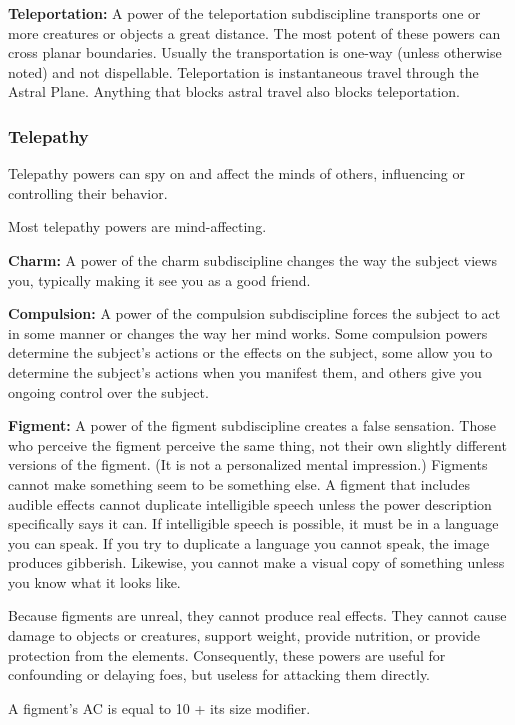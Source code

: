 \textbf{Teleportation:} A power of the teleportation subdiscipline transports one or more creatures or objects a great distance. The most potent of these powers can cross planar boundaries. Usually the transportation is one-way (unless otherwise noted) and not dispellable. Teleportation is instantaneous travel through the Astral Plane. Anything that blocks astral travel also blocks teleportation.

\subsubsection{Telepathy}
Telepathy powers can spy on and affect the minds of others, influencing or controlling their behavior.

Most telepathy powers are mind-affecting.


\textbf{Charm:} A power of the charm subdiscipline changes the way the subject views you, typically making it see you as a good friend.

\textbf{Compulsion:} A power of the compulsion subdiscipline forces the subject to act in some manner or changes the way her mind works. Some compulsion powers determine the subject's actions or the effects on the subject, some allow you to determine the subject's actions when you manifest them, and others give you ongoing control over the subject.

\textbf{Figment:} A power of the figment subdiscipline creates a false sensation. Those who perceive the figment perceive the same thing, not their own slightly different versions of the figment. (It is not a personalized mental impression.) Figments cannot make something seem to be something else. A figment that includes audible effects cannot duplicate intelligible speech unless the power description specifically says it can. If intelligible speech is possible, it must be in a language you can speak. If you try to duplicate a language you cannot speak, the image produces gibberish. Likewise, you cannot make a visual copy of something unless you know what it looks like.

Because figments are unreal, they cannot produce real effects. They cannot cause damage to objects or creatures, support weight, provide nutrition, or provide protection from the elements. Consequently, these powers are useful for confounding or delaying foes, but useless for attacking them directly.

A figment's AC is equal to 10 + its size modifier.
